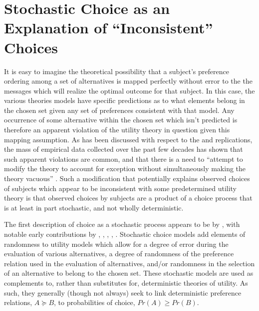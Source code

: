 \documentclass[11pt,a4paper]{report}
\newcommand\Prob{\ensuremath{\mathit{Pr}}}  %
\begin{document}
\section{Stochastic Choice as an Explanation of \enquote{Inconsistent} Choices}

It is easy to imagine the theoretical possibility that a subject's preference ordering among a set of alternatives is mapped perfectly without error to the the messages which will realize the optimal outcome for that subject.
In this case, the various theories models have specific predictions as to what elements belong in the chosen set given any set of preferences consistent with that model.
Any occurrence of some alternative within the chosen set which isn't predicted is therefore an apparent violation of the utility theory in question given this mapping assumption.
As has been discussed with respect to the \textcite{Grether1979} and \textcite{Holt2002} replications, the mass of empirical data collected over the past few decades has shown that such apparent violations are common, and that there is a need to \enquote{attempt to modify the theory to account for  exception without simultaneously making the theory vacuous} \textcite[634]{Grether1979}.
Such a modification that potentially explains observed choices of subjects which appear to be inconsistent with some predetermined utility theory is that observed choices by subjects are a product of a choice process that is at least in part stochastic, and not wholly deterministic.


The first description of choice as a stochastic process appears to be by \textcite{Edwards1954}, with notable early contributions by \textcite{Luce1958}, \textcite{Debreu1958}, \textcite{Davidson1959}, \textcite{Becker1963}, \textcite{Luce1965}.
Stochastic choice models add elements of randomness to utility models which allow for a degree of error during the evaluation of various alternatives, a degree of randomness of the preference relation used  in the evaluation of alternatives, and/or randomness in the selection of an alternative to belong to the chosen set.
These stochastic models are used as complements to, rather than substitutes for, deterministic theories of utility.
As such, they generally (though not always) seek to link deterministic preference relations, $A \succeq B$, to probabilities of choice, ${\Prob}(A) \geq {\Prob}(B)$.
\end{document}
